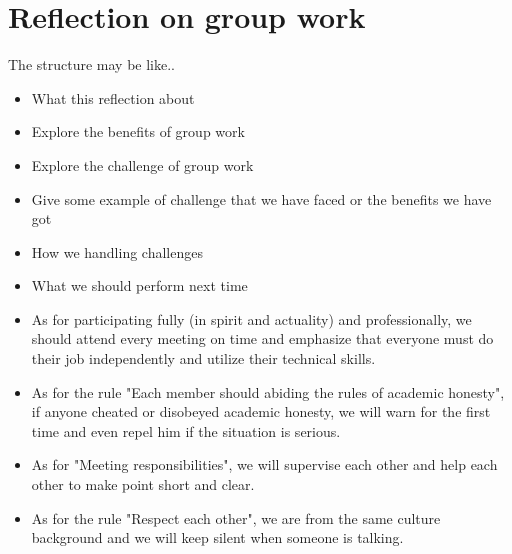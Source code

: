 \newpage
\section{Reflection on group work}
The structure may be like..
\begin{itemize}
    \item What this reflection about
    \item Explore the benefits of group work
    \item Explore the challenge of group work
    \item Give some example of challenge that we have faced or the benefits we have got
    \item How we handling challenges
    \item What we should perform next time
\end{itemize}

\begin{itemize}
    \item As for participating fully (in spirit and actuality) and professionally, we should attend every meeting on time and emphasize that everyone must do their job independently and utilize their technical skills.
    \item As for the rule "Each member should abiding the rules of academic honesty", if anyone cheated or disobeyed academic honesty, we will warn for the first time and even repel him if the situation is serious.
    \item As for "Meeting responsibilities", we will supervise each other and help each other to make point short and clear.
    \item As for the rule "Respect each other", we are from the same culture background and we will keep silent when someone is talking.

\end{itemize}